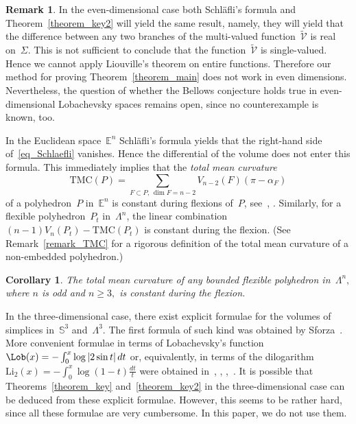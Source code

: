 \documentclass[reqno,tbtags,12pt]{amsart}
\numberwithin{equation}{section}
\newcommand{\E}{\mathbb{E}}
\newcommand{\bS}{\mathbb{S}}
\newcommand{\tCV}{\widetilde{\mathcal{V}}}
\newtheorem{cor}[theorem]{Corollary}
\theoremstyle{definition}
\newtheorem{remark}[theorem]{Remark}
\begin{document}
\begin{remark}\label{remark_even}
In the even-dimensional case both Schl\"afli's formula and Theorem~\ref{theorem_key2} will yield the same result, namely, they will yield that the difference between any two branches of the multi-valued function~$\tCV$ is real on~$\Sigma$. This is not sufficient to conclude that the function~$\tCV$ is single-valued. Hence we cannot apply Liouville's theorem on entire functions. Therefore our method for proving Theorem~\ref{theorem_main} does not work in even dimensions. Nevertheless, the question of whether the Bellows conjecture holds true in even-dimensional Lobachevsky spaces remains open, since no counterexample is known, too.
\end{remark}   

In the Euclidean space~$\E^n$ Schl\"afli's formula yields that the right-hand side of~\eqref{eq_Schlaefli} vanishes. Hence the differential of the volume does not enter this formula. This immediately implies that the \textit{total mean curvature}
\begin{equation}\label{eq_TMC}
\mathrm{TMC}(P)=\sum_{F\subset P,\,\dim F=n-2}V_{n-2}(F)(\pi-\alpha_F)
\end{equation}
 of a polyhedron~$P$ in~$\E^n$ is constant during flexions of~$P$, see~\cite{Ale85}, \cite{AlRi98}. Similarly,  for a flexible polyhedron~$P_t$ in~$\Lambda^n$, the linear combination $(n-1)V_n(P_t)-\mathrm{TMC}(P_t)$ is constant during the flexion. (See Remark~\ref{remark_TMC} for a rigorous definition of the total mean curvature of a non-embedded polyhedron.)

\begin{cor}\label{cor_TMC}
The total mean curvature of any bounded flexible polyhedron in~$\Lambda^n,$ where $n$ is odd and $n\ge 3,$ is constant during the flexion.
\end{cor}

In the three-dimensional case, there exist explicit formulae for the volumes of simplices in~$\bS^3$ and~$\Lambda^3$. The first formula of such kind was obtained by Sforza~\cite{Sfo07}. More convenient formulae in terms of Lobachevsky's function $\Lob(x)=-\int_0^x\log|2\sin t|\,dt$ or, equivalently, in terms of the dilogarithm $\mathrm{Li}_2(x)=-\int_0^x\log(1-t)\frac{dt}{t}$ were obtained in~\cite{ChKi99}, \cite{MuYa05}, \cite{MuUs05},~\cite{DeMe05}. It is possible that Theorems~\ref{theorem_key} and~\ref{theorem_key2} in the three-dimensional case can be deduced from these explicit formulae. However, this seems to be rather hard, since all these formulae are very cumbersome. In this paper, we do not use them.
\end{document}
